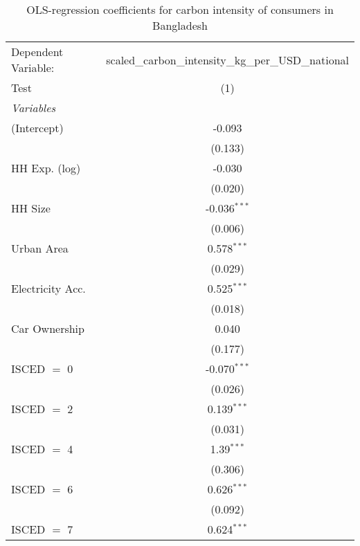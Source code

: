 
\begin{table}[htbp!]
   \centering
   \small
   \begin{adjustbox}{width = 1\textwidth, max height = 0.95\textheight, center}
      \begin{threeparttable}[b]
         \caption{\label{tab:OLS_1_BGD} OLS-regression coefficients for carbon intensity of consumers in Bangladesh}
         \begin{tabular}{lc}
            \tabularnewline \midrule \midrule
            Dependent Variable: & scaled\_carbon\_intensity\_kg\_per\_USD\_national\\        
            Test                & (1)\\  
            \midrule
            \emph{Variables}\\
            (Intercept)         & -0.093\\   
                                & (0.133)\\   
            HH Exp. (log)       & -0.030\\   
                                & (0.020)\\   
            HH Size             & -0.036$^{***}$\\   
                                & (0.006)\\   
            Urban Area          & 0.578$^{***}$\\   
                                & (0.029)\\   
            Electricity Acc.    & 0.525$^{***}$\\   
                                & (0.018)\\   
            Car Ownership       & 0.040\\   
                                & (0.177)\\   
            ISCED $=$ 0         & -0.070$^{***}$\\   
                                & (0.026)\\   
            ISCED $=$ 2         & 0.139$^{***}$\\   
                                & (0.031)\\   
            ISCED $=$ 4         & 1.39$^{***}$\\   
                                & (0.306)\\   
            ISCED $=$ 6         & 0.626$^{***}$\\   
                                & (0.092)\\   
            ISCED $=$ 7         & 0.624$^{***}$\\   

\end{tabular}
\end{threeparttable}
\end{adjustbox}
\end{table}
